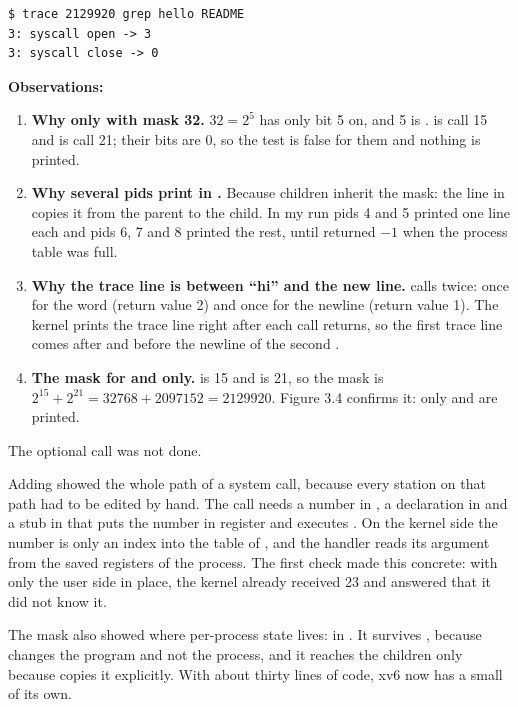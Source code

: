 \documentclass[11pt,a4paper]{article}
\begin{document}
\begin{lstlisting}[caption={Only open and close (mask 2129920)}]
$ trace 2129920 grep hello README
3: syscall open -> 3
3: syscall close -> 0
\end{lstlisting}

\textbf{Observations:}
\begin{enumerate}
  \item \textbf{Why only  with mask 32.} \(32 = 2^5\) has only bit 5 on, and 5 is
  .  is call 15 and  is call 21; their bits are 0, so the
  test  is false for them and nothing is printed.
  \item \textbf{Why several pids print in .} Because children inherit the
  mask: the line  in  copies it from the
  parent to the child. In my run pids 4 and 5 printed one line each and pids 6, 7 and 8 printed
  the rest, until  returned \(-1\) when the process table was full.
  \item \textbf{Why the trace line is between ``hi'' and the new line.}  calls
   twice: once for the word  (return value 2) and once for the newline
  (return value 1). The kernel prints the trace line right after each call returns, so the first
  trace line comes after  and before the newline of the second .
  \item \textbf{The mask for  and  only.}  is 15 and
   is 21, so the mask is \(2^{15} + 2^{21} = 32768 + 2097152 = 2129920\). Figure 3.4
  confirms it: only  and  are printed.
\end{enumerate}

The optional  call was not done.


Adding  showed the whole path of a system call, because every station on that path
had to be edited by hand. The call needs a number in , a declaration in
 and a stub in  that puts the number in register  and
executes . On the kernel side the number is only an index into the table of
, and the handler reads its argument from the saved registers of the process.
The first check made this concrete: with only the user side in place, the kernel already
received 23 and answered that it did not know it.

The mask also showed where per-process state lives: in . It survives
, because  changes the program and not the process, and it reaches the
children only because  copies it explicitly. With about thirty lines of code, xv6
now has a small  of its own.
\end{document}
